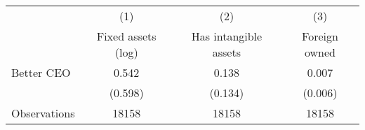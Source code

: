 {
\def\sym#1{\ifmmode^{#1}\else\(^{#1}\)\fi}
\begin{tabular}{l*{3}{c}}
\hline\hline
                    &\multicolumn{1}{c}{(1)}&\multicolumn{1}{c}{(2)}&\multicolumn{1}{c}{(3)}\\
                    &\multicolumn{1}{c}{Fixed assets (log)}&\multicolumn{1}{c}{Has intangible assets}&\multicolumn{1}{c}{Foreign owned}\\
\hline
Better CEO          &       0.542         &       0.138         &       0.007         \\
                    &     (0.598)         &     (0.134)         &     (0.006)         \\
\hline
Observations        &       18158         &       18158         &       18158         \\
\hline\hline
\end{tabular}
}
